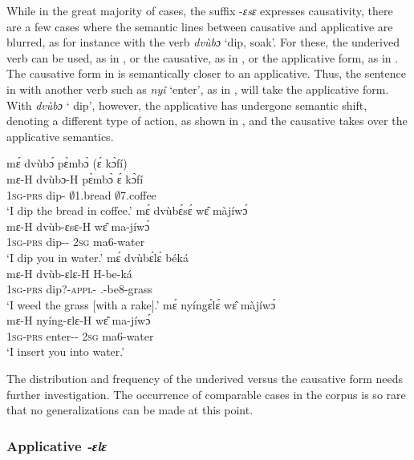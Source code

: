 While in the great majority of cases, the suffix -{\itshape ɛsɛ} expresses causativity, there are a few cases where the semantic lines between causative and applicative are blurred, as for instance with the verb {\itshape dvùbɔ} `dip, soak'.  For these, the underived verb can be used, as in , or the causative, as in , or the applicative form, as in . The causative form in  is semantically closer to an applicative. Thus, the sentence in  with another verb such as {\itshape nyî} `enter', as in , will take the applicative form. With {\itshape dvùbɔ} ` dip', however, the applicative has undergone semantic shift, denoting a different type of action, as shown in , and the causative takes over the applicative semantics. 


\ea \label{causative}
\ea  \label{causative1}
  \glll  mɛ́ dvùbɔ́ pɛ̀mbɔ̀ (ɛ́ kɔ̀fí) \\
	mɛ-H dvùbɔ-H pɛ̀mbɔ̀ ɛ́ kɔ̀fí \\
              1\textsc{sg}-\textsc{prs} dip-{\R} $\emptyset$1.bread {\LOC} $\emptyset$7.coffee \\
    \trans `I dip the bread in coffee.'
\ex\label{causative2}
 \glll  mɛ́ dvùbɛ́sɛ́ wɛ̂ màjíwɔ́ \\
	mɛ-H dvùb-ɛsɛ-H wɛ̂ ma-jíwɔ́ \\
         1\textsc{sg}-\textsc{prs} dip-{\CAUS}-{\R} 2\textsc{sg} ma6-water  \\
    \trans `I dip you in water.'
\ex\label{causative3}
 \glll  mɛ́ dvùbɛ́lɛ́ béká  \\
	mɛ-H dvùb-ɛlɛ-H H-be-ká \\
         1\textsc{sg}-\textsc{prs} dip?-\textsc{appl}-{\R} {\OBJ}.{\LINK}-be8-grass \\
    \trans `I weed the grass [with a rake].'
\z
\ex \label{causative4}
 \glll  mɛ́ nyíngɛ́lɛ́ wɛ̂ màjíwɔ́ \\
	mɛ-H nyíng-ɛlɛ-H wɛ̂ ma-jíwɔ́ \\
         1\textsc{sg}-\textsc{prs} enter-{\CAUS}-{\R} 2\textsc{sg} ma6-water  \\
    \trans `I insert you into water.'
\z

The distribution and frequency of the underived versus the causative form needs further investigation. The occurrence of comparable cases in the corpus is so rare that no generalizations can be made at this point.


\subsubsection{Applicative \textit{-ɛlɛ}}
\label{sec:APP}


